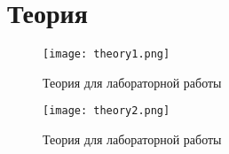 \chapter{Теория}
\label{ch:intro}

\begin{figure}[H]
    \centering
    \texttt{[image: theory1.png]}
    \caption{Теория для лабораторной работы}
\end{figure}

\begin{figure}[H]
    \centering
    \texttt{[image: theory2.png]}
    \caption{Теория для лабораторной работы}
\end{figure}

\endinput